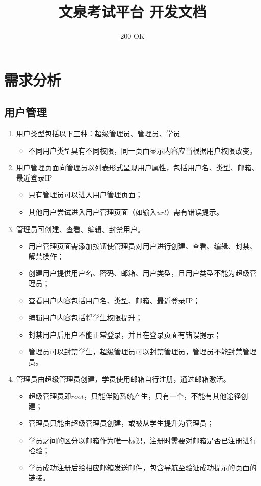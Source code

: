 \documentclass{article}
\title{文泉考试平台 开发文档}
\author{200 OK}
\date{}
\begin{document}
\maketitle

\section{需求分析}
    \subsection{用户管理}
        \begin{enumerate}
         \item 用户类型包括以下三种：超级管理员、管理员、学员
            \begin{itemize}
             \item 不同用户类型具有不同权限，同一页面显示内容应当根据用户权限改变。
            \end{itemize}
        \item 用户管理页面向管理员以列表形式呈现用户属性，包括用户名、类型、邮箱、最近登录IP
            \begin{itemize}
             \item 只有管理员可以进入用户管理页面；
             \item 其他用户尝试进入用户管理页面（如输入$url$）需有错误提示。
            \end{itemize}
        \item 管理员可创建、查看、编辑、封禁用户。
            \begin{itemize}
             \item 用户管理页面需添加按钮使管理员对用户进行创建、查看、编辑、封禁、解禁操作；
             \item 创建用户提供用户名、密码、邮箱、用户类型，且用户类型不能为超级管理员；
             \item 查看用户内容包括用户名、类型、邮箱、最近登录IP；
             \item 编辑用户内容包括将学生权限提升；
             \item 封禁用户后用户不能正常登录，并且在登录页面有错误提示；
             \item 管理员可以封禁学生，超级管理员可以封禁管理员，管理员不能封禁管理员。
            \end{itemize}
        \item 管理员由超级管理员创建，学员使用邮箱自行注册，通过邮箱激活。
            \begin{itemize}
             \item 超级管理员即$root$，只能伴随系统产生，只有一个，不能有其他途径创建；
             \item 管理员只能由超级管理员创建，或被从学生提升为管理员；
             \item 学员之间的区分以邮箱作为唯一标识，注册时需要对邮箱是否已注册进行检验；
             \item 学员成功注册后给相应邮箱发送邮件，包含导航至验证成功提示的页面的链接。
            \end{itemize}
        \end{enumerate}
\end{document}
